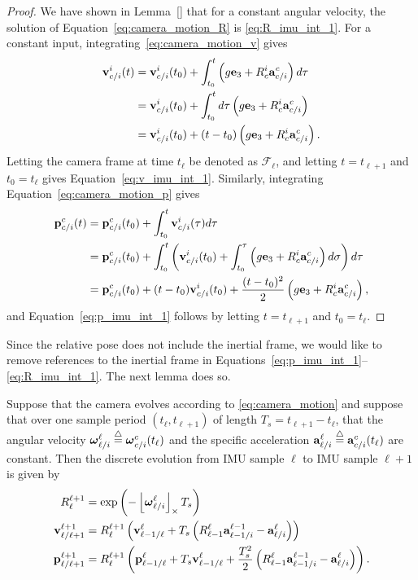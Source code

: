 \begin{proof}
	We have shown in Lemma~\ref{} that for a constant angular velocity, the solution of Equation~\eqref{eq:camera_motion_R} is \eqref{eq:R_imu_int_1}.
	For a constant input, integrating~\eqref{eq:camera_motion_v} gives
	\begin{align*}
	\mathbf{v}_{c/i}^i(t) &= \mathbf{v}_{c/i}^i(t_0) + \int_{t_0}^t \left(g\mathbf{e}_3 + R_c^i \mathbf{a}_{c/i}^c\right)d\tau \\
		&= \mathbf{v}_{c/i}^i(t_0) + \int_{t_0}^t d\tau \left(g\mathbf{e}_3 + R_c^i \mathbf{a}_{c/i}^c\right) \\
		&= \mathbf{v}_{c/i}^i(t_0) + (t-t_0) \left(g\mathbf{e}_3 + R_c^i \mathbf{a}_{c/i}^c\right).
	\end{align*}
	Letting the camera frame at time $t_\ell$ be denoted as $\mathcal{F}_\ell$, and letting $t=t_{\ell+1}$ and $t_0=t_{\ell}$ gives Equation~\eqref{eq:v_imu_int_1}.  Similarly, integrating Equation~\eqref{eq:camera_motion_p} gives
	\begin{align*}
	\mathbf{p}_{c/i}^c(t) &= \mathbf{p}_{c/i}^c(t_0) + \int_{t_0}^t \mathbf{v}_{c/i}^i(\tau)d\tau \\
		&= \mathbf{p}_{c/i}^c(t_0) + \int_{t_0}^t \left(\mathbf{v}_{c/i}^i(t_0) + \int_{t_0}^\tau \left(g\mathbf{e}_3 + R_c^i \mathbf{a}_{c/i}^c\right)d\sigma \right) d\tau \\
		&= \mathbf{p}_{c/i}^c(t_0) + (t-t_0)\mathbf{v}_{c/i}^i(t_0) + \frac{(t-t_0)^2}{2}\left(g\mathbf{e}_3 + R_c^i \mathbf{a}_{c/i}^c\right),
	\end{align*}
	and Equation~\eqref{eq:p_imu_int_1} follows by letting $t=t_{\ell+1}$ and $t_0=t_{\ell}$.
\end{proof}
Since the relative pose does not include the inertial frame, we would like to remove references to the inertial frame in Equations~\eqref{eq:p_imu_int_1}--\eqref{eq:R_imu_int_1}.  The next lemma does so.
\begin{lemma}
	Suppose that the camera evolves according to \eqref{eq:camera_motion} and suppose that over one sample period $(t_\ell, t_{\ell+1})$ of length $T_s=t_{\ell+1}-t_\ell$, that the angular velocity $\boldsymbol{\omega}_{\ell/i}^{\ell}\stackrel{\triangle}{=}\boldsymbol{\omega}_{c/i}^c(t_\ell)$ and the specific acceleration $\mathbf{a}_{\ell/i}^{\ell}\stackrel{\triangle}{=} \mathbf{a}_{c/i}^c(t_\ell)$ are constant.  Then the discrete evolution from IMU sample $\ell$ to IMU sample $\ell+1$ is given by
	\begin{align}
	R_{\ell}^{\ell+1} &= \exp\left(-\ss{\omegabf_{\ell/i}^{\ell}} T_s \right)
		\label{eq:R_imu_int_2} \\
	\vbf_{\ell/\ell+1}^{\ell+1} &= R_{\ell}^{\ell+1}\left( \vbf_{\ell-1/\ell}^{\ell} 
		+ T_s \left(R_{\ell-1}^\ell \abf_{\ell-1/i}^{\ell-1} - \abf_{\ell/i}^\ell \right) \right)  \label{eq:v_imu_int_2} \\
	\pbf_{\ell/\ell+1}^{\ell+1} &= R_{\ell}^{\ell+1}\left(\pbf_{\ell-1/\ell}^{\ell} 
		+T_s\vbf_{\ell-1/\ell}^{\ell} + \frac{T_s^2}{2}\left(R_{\ell-1}^\ell \abf_{\ell-1/i}^{\ell-1} - \abf_{\ell/i}^{\ell}\right)\right).
		\label{eq:p_imu_int_2}
\end{align}
\end{lemma}

